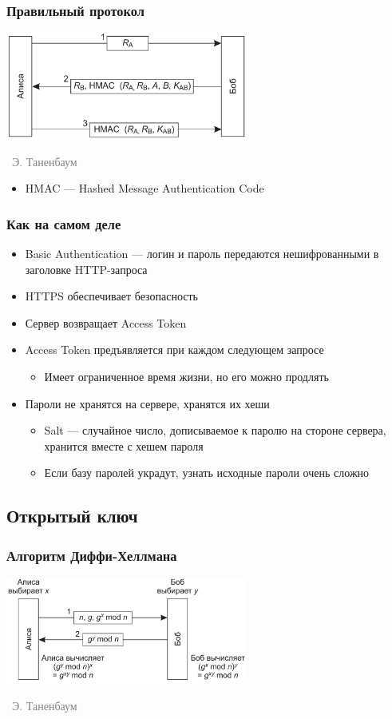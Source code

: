 \documentclass[xetex,mathserif,serif]{beamer}
\newcommand{\attribution}[1] {
\vspace{-5mm}\begin{flushright}\begin{scriptsize}\textcolor{gray}{\textcopyright\, #1}\end{scriptsize}\end{flushright}
}
\begin{document}
	\begin{frame}
		\frametitle{Правильный протокол}
		\begin{center}
			\includegraphics[width=0.6\textwidth]{hmacs.png}
			\attribution{Э. Таненбаум}
		\end{center}
		\begin{itemize}
			\item HMAC --- Hashed Message Authentication Code
		\end{itemize}
	\end{frame}

	\begin{frame}
		\frametitle{Как на самом деле}
		\begin{itemize}
			\item Basic Authentication --- логин и пароль передаются нешифрованными в заголовке HTTP-запроса
			\item HTTPS обеспечивает безопасность
			\item Сервер возвращает Access Token
			\item Access Token предъявляется при каждом следующем запросе
			\begin{itemize}
				\item Имеет ограниченное время жизни, но его можно продлять
			\end{itemize}
			\item Пароли не хранятся на сервере, хранятся их хеши
			\begin{itemize}
				\item Salt --- случайное число, дописываемое к паролю на стороне сервера, хранится вместе с хешем пароля
				\item Если базу паролей украдут, узнать исходные пароли очень сложно
			\end{itemize}
		\end{itemize}
	\end{frame}

	\subsection{Открытый ключ}

	\begin{frame}
		\frametitle{Алгоритм Диффи-Хеллмана}
		\begin{center}
			\includegraphics[width=0.6\textwidth]{diffieHellman.png}
			\attribution{Э. Таненбаум}
		\end{center}
	\end{frame}
\end{document}

